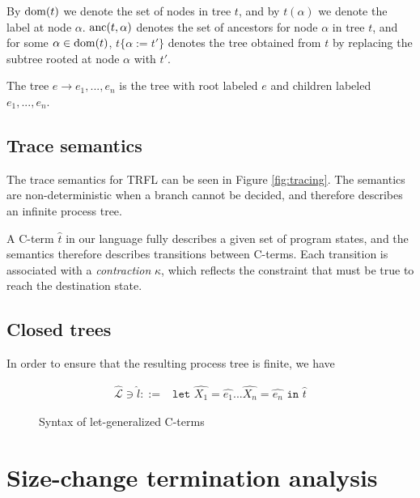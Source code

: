 \documentclass[10pt]{../sigplanconf}
\newcommand{\dom}{\ensuremath{{\rm dom}}}
\begin{document}
By $\dom(t)$ we denote the set of nodes in tree $t$, and by
$t(\alpha)$ we denote the label at node $\alpha$. ${\rm anc}(t,
\alpha)$ denotes the set of ancestors for node $\alpha$ in tree $t$,
and for some $\alpha \in \dom(t)$, $t\{\alpha := t'\}$ denotes the
tree obtained from $t$ by replacing the subtree rooted at node
$\alpha$ with $t'$.

The tree $e \rightarrow e_1, ..., e_n$ is the tree with root labeled
$e$ and children labeled $e_1, ..., e_n$.

\subsection{Trace semantics}
The trace semantics for TRFL can be seen in Figure
\ref{fig:tracing}. The semantics are non-deterministic when a branch
cannot be decided, and therefore describes an infinite process tree.

A C-term $\widehat{t}$ in our language fully describes a given set of
program states, and the semantics therefore describes transitions
between C-terms. Each transition is associated with a
\emph{contraction} $\kappa$, which reflects the constraint that must
be true to reach the destination state.

\subsection{Closed trees}
In order to ensure that the resulting process tree is finite, we have

\begin{figure}\centering
  \begin{align*}
    \widehat{\mathcal{L}} \ni \widehat{l} ::= & \texttt{let $\widehat{X_1} = \widehat{e_1} ... \widehat{X_n} = \widehat{e_n}$ in $\widehat{t}$}
  \end{align*}
  \caption{Syntax of let-generalized C-terms}
\end{figure}

\section{Size-change termination analysis}
\end{document}
